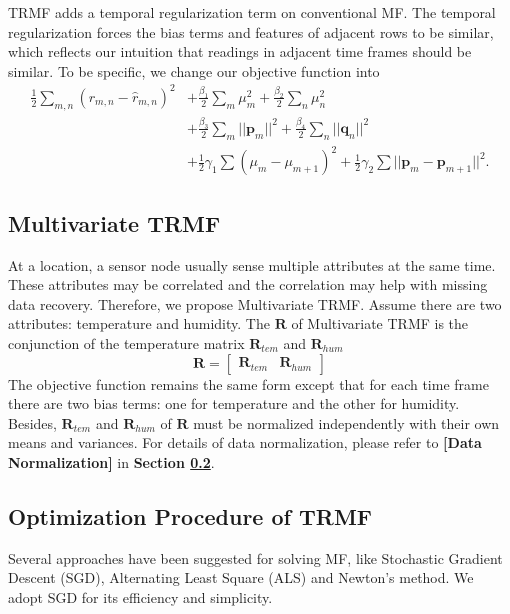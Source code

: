 TRMF adds a temporal regularization term on conventional MF. The temporal regularization forces the bias terms and features of adjacent rows to be similar, which reflects our intuition that readings in adjacent time frames should be similar. To be specific, we change our objective function into 
\begin{equation*}\begin{aligned}
\frac{1}{2}\sum_{m,n}{(r_{m,n} - \hat{r}_{m,n})}^2 &+ \frac{\beta_1}{2}\sum_m{\mu_m^2} + \frac{\beta_2}{2}\sum_n{\mu_n^2}\\
&+ \frac{\beta_3}{2}\sum_m{||\mathbf{p}_m||^2} + \frac{\beta_4}{2}\sum_n{||\mathbf{q}_n||^2}\\ 
&+ \frac{1}{2}\gamma_1\sum{(\mu_m-\mu_{m+1})^2} + \frac{1}{2}\gamma_2\sum{||\mathbf{p}_m-\mathbf{p}_{m+1}||^2}.
\end{aligned}\end{equation*}


\subsection{Multivariate TRMF}
At a location, a sensor node usually sense multiple attributes at the same time. These attributes may be correlated and the correlation may help with missing data recovery. Therefore, we propose Multivariate TRMF. Assume there are two attributes: temperature and humidity. The $\mathbf{R}$ of Multivariate TRMF is the conjunction of the temperature matrix $\mathbf{R}_{tem}$ and $\mathbf{R}_{hum}$
\begin{equation*} \mathbf{R} = \begin{bmatrix}\mathbf{R}_{tem} & \mathbf{R}_{hum} \end{bmatrix} \end{equation*}
The objective function remains the same form except that for each time frame there are two bias terms: one for temperature and the other for humidity. Besides, $\mathbf{R}_{tem}$ and $\mathbf{R}_{hum}$ of $\mathbf{R}$ must be normalized independently with their own means and variances. For details of data normalization, please refer to \textbf{[Data Normalization]} in \textbf{Section \ref{optimation_procedure}}.


\subsection{Optimization Procedure of TRMF}
\label{optimation_procedure}
Several approaches have been suggested for solving MF, like Stochastic Gradient Descent (SGD)\cite{koren2009matrix,chih2008large}, Alternating Least Square (ALS)\cite{koren2009matrix,zhou2008large} and Newton's method\cite{buchanan2005damped}. We adopt SGD for its efficiency and simplicity. 

